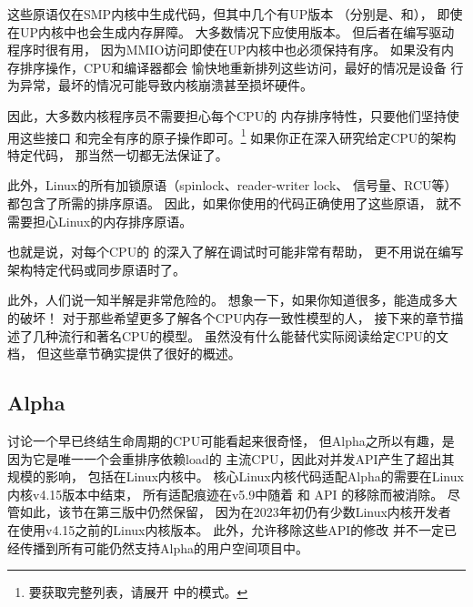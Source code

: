 \QuickQuizEnd

这些原语仅在SMP内核中生成代码，但其中几个有UP版本
（分别是、和），
即使在UP内核中也会生成内存屏障。
大多数情况下应使用版本。
但后者在编写驱动程序时很有用，
因为MMIO访问即使在UP内核中也必须保持有序。
如果没有内存排序操作，CPU和编译器都会
愉快地重新排列这些访问，最好的情况是设备
行为异常，最坏的情况可能导致内核崩溃甚至损坏硬件。

因此，大多数内核程序员不需要担心每个CPU的
内存排序特性，只要他们坚持使用这些接口
和完全有序的原子操作即可。\footnote{
	要获取完整列表，请展开
	中的模式。}
如果你正在深入研究给定CPU的架构特定代码，
那当然一切都无法保证了。

此外，Linux的所有加锁原语（spinlock、reader-writer lock、
信号量、RCU等）都包含了所需的排序原语。
因此，如果你使用的代码正确使用了这些原语，
就不需要担心Linux的内存排序原语。

也就是说，对每个CPU的
的深入了解在调试时可能非常有帮助，
更不用说在编写架构特定代码或同步原语时了。

此外，人们说一知半解是非常危险的。
想象一下，如果你知道很多，能造成多大的破坏！
对于那些希望更多了解各个CPU内存一致性模型的人，
接下来的章节描述了几种流行和著名CPU的模型。
虽然没有什么能替代实际阅读给定CPU的文档，
但这些章节确实提供了很好的概述。

\subsection{Alpha}
\label{sec:memorder:Alpha}

讨论一个早已终结生命周期的CPU可能看起来很奇怪，
但Alpha之所以有趣，是因为它是唯一一个会重排序依赖load的
主流CPU，因此对并发API产生了超出其规模的影响，
包括在Linux内核中。
核心Linux内核代码适配Alpha的需要在Linux内核v4.15版本中结束，
所有适配痕迹在v5.9中随着
和 API
的移除而被消除。
尽管如此，该节在第三版中仍然保留，
因为在2023年初仍有少数Linux内核开发者
在使用v4.15之前的Linux内核版本。
此外，允许移除这些API的修改
并不一定已经传播到所有可能仍然支持Alpha的用户空间项目中。

